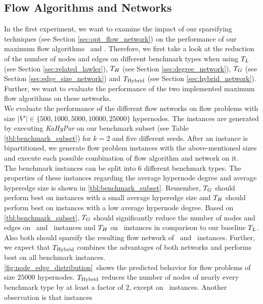 \subsection{Flow Algorithms and Networks}
\label{sec:exp_flow_network}

In the first experiment, we want to examine the impact of our sparsifying techniques (see Section \ref{sec:opt_flow_network})
on the performance of our maximum flow algorithms \GoldbergTarjan~and \EdmondKarp. 
Therefore, we first take a look at the reduction of the number of nodes and edges on different benchmark types
when using $T_L$ (see Section \ref{sec:related_lawler}), $T_H$ (see Section 
\ref{sec:degree_network}), $T_G$ (see Section \ref{sec:edge_size_network})
and $T_{\text{Hybrid}}$ (see Section \ref{sec:hybrid_network}). Further, we
want to evaluate the performance of the two implemented maximum flow algorithms on these
networks. \\
We evaluate the performance of the different flow networks on flow problems with size
$|V'| \in \{500,1000,5000,10000,25000\}$ hypernodes. The instances are generated by executing
\emph{KaHyPar} on our benchmark subset (see Table \ref{tbl:benchmark_subset}) for $k = 2$ and five different 
seeds. After an instance is bipartitioned, we generate flow problem instances
with the above-mentioned sizes and execute each possible combination of flow algorithm and
network on it. \\
The benchmark instances can be split into $6$ different benchmark types. The properties of these instances
regarding the average hypernode degree and average hyperedge size is shown in \autoref{tbl:benchmark_subset}.
Remember, $T_G$ should perform best on instances with a small average hyperedge size and
$T_H$ should perform best on instances with a low average hypernode degree. Based on 
\autoref{tbl:benchmark_subset}, $T_G$ should significantly reduce the number of
nodes and edges on \Primal~and \Literal~instances and $T_H$ on \Dual~instances in
comparison to our baseline $T_L$. Also both should sparsify the resulting flow network
of \ISPD~and \DAC~instances. Further, we expect that $T_{\text{Hybrid}}$ combines the advantages of
both networks and performs best on all benchmark instances.\\
\autoref{fig:node_edge_distribution}~shows the predicted behavior for flow problems of size
$25000$ hypernodes. $T_{\text{Hybrid}}$ reduces the number of nodes of nearly every benchmark type 
by at least a factor of $2$, except on \SPM~instances. Another observation is that instances 
